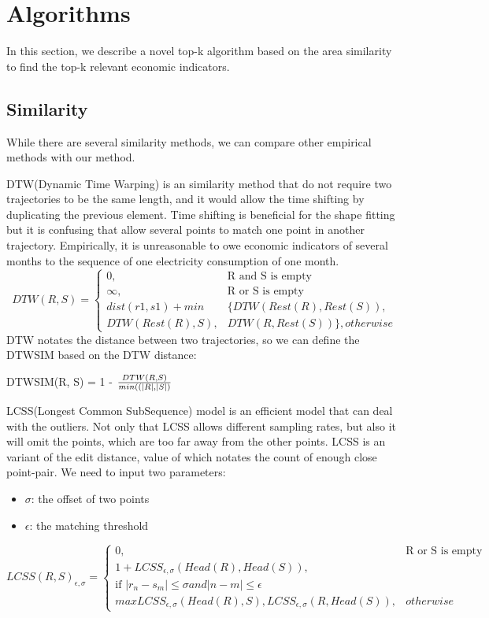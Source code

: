 \documentclass{sig-alternate-05-2015}
\begin{document}
\section{Algorithms}
In this section, we describe a novel top-k algorithm based on the area similarity to find the top-k relevant economic indicators. 
\subsection{Similarity}

While there are several similarity methods, we can compare other empirical methods with our method. 

DTW(Dynamic Time Warping) is an similarity method that do not require two trajectories to be the same length, and it would allow the time shifting by duplicating the previous element.  Time shifting is beneficial for the shape fitting but it is confusing that allow several points to match one point in another trajectory. Empirically, it is unreasonable to owe economic indicators of several months to the sequence of one electricity consumption of one month.
\begin{equation}
	DTW(R, S) = \left\{
	\begin{array}{ll}
		0,  & \text{R and S is empty}  \\
		\infty,  & \text{R or S is empty}  \\
		dist(r1, s1) + min & \{DTW(Rest(R), Rest(S)),  \\
		 DTW(Rest(R), S), & DTW(R, Rest(S))\}, otherwise
	\end{array}
	\right.
\end{equation} 
DTW notates the distance between two trajectories, so we can define the DTWSIM based on the DTW distance:
\begin{definition}
	DTWSIM(R, S) = 1 - $\frac{DTW(R, S)}{min(\text(|R|, |S|)}$
\end{definition}

LCSS(Longest Common SubSequence) model is an efficient model that can deal with the outliers. Not only that LCSS allows different sampling rates, but also it will omit the points, which are too far away from the other points. LCSS is an variant of the edit distance, value of which notates the count of enough close point-pair. We need to input two parameters:
\begin{itemize}
	\item $\sigma$: the offset of two points
	\item $\epsilon$: the matching threshold 
\end{itemize} 
\begin{equation}
	LCSS(R, S)_{\epsilon, \sigma} = \left\{
	\begin{array}{ll}
		0, & \text{R or S is empty} \\
		1 + LCSS_{\epsilon, \sigma}(Head(R), Head(S)), \\
		\text{if $|r_n - s_m| \leq \sigma and |n - m| \leq \epsilon$} \\
		max{LCSS_{\epsilon, \sigma}(Head(R), S), LCSS_{\epsilon, \sigma}(R, Head(S))}, & otherwise
	\end{array}
	\right.
\end{equation}
\end{document}
